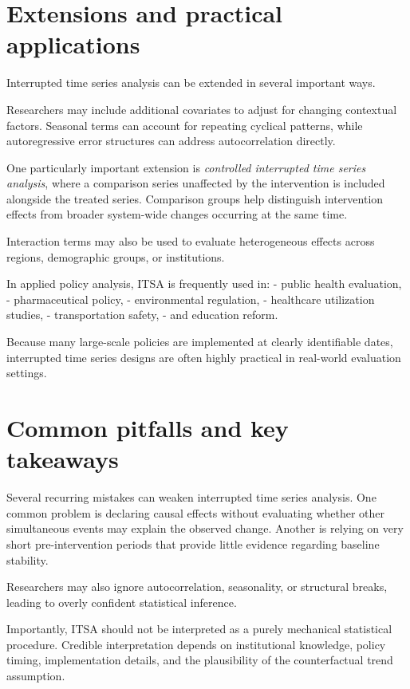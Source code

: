 \documentclass[
  11pt,
  oneside]{book}
\begin{document}
\section{Extensions and practical applications}\label{extensions-and-practical-applications}

Interrupted time series analysis can be extended in several important ways.

Researchers may include additional covariates to adjust for changing contextual factors. Seasonal terms can account for repeating cyclical patterns, while autoregressive error structures can address autocorrelation directly.

One particularly important extension is \emph{controlled interrupted time series analysis}, where a comparison series unaffected by the intervention is included alongside the treated series. Comparison groups help distinguish intervention effects from broader system-wide changes occurring at the same time.

Interaction terms may also be used to evaluate heterogeneous effects across regions, demographic groups, or institutions.

In applied policy analysis, ITSA is frequently used in:
- public health evaluation,
- pharmaceutical policy,
- environmental regulation,
- healthcare utilization studies,
- transportation safety,
- and education reform.

Because many large-scale policies are implemented at clearly identifiable dates, interrupted time series designs are often highly practical in real-world evaluation settings.

\section{Common pitfalls and key takeaways}\label{common-pitfalls-and-key-takeaways-5}

Several recurring mistakes can weaken interrupted time series analysis. One common problem is declaring causal effects without evaluating whether other simultaneous events may explain the observed change. Another is relying on very short pre-intervention periods that provide little evidence regarding baseline stability.

Researchers may also ignore autocorrelation, seasonality, or structural breaks, leading to overly confident statistical inference.

Importantly, ITSA should not be interpreted as a purely mechanical statistical procedure. Credible interpretation depends on institutional knowledge, policy timing, implementation details, and the plausibility of the counterfactual trend assumption.
\end{document}
